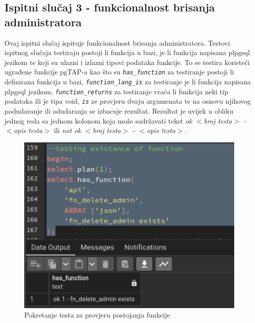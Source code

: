 				\subsection{Ispitni slučaj 3 - funkcionalnost brisanja administratora}
				Ovaj ispitni slučaj ispituje funkcionalnost brisanja administratora. Testovi ispitnog slučaja testiraju postoji li funkcija u bazi, je li funkcija napisana plpgsql jezikom te koji su ulazni i izlazni tipovi podataka funkcije. To se testira koristeći ugrađene funkcije pgTAP-a kao što su \textit{\texttt{has\_function}} za testiranje postoji li definirana funkcija u bazi, \textit{\texttt{function\_lang\_is}} za testiranje je li funkcija napisana plpgsql jezikom, \textit{\texttt{function\_returns}} za testiranje vraća li funkcija neki tip podataka ili je tipa void, \textit{\texttt{is\(\)}} ze provjeru dvaju argumenata te na osnovu njihovog podudaranje ili odudaranja se izbacuje rezultat. Rezultat je uvijek u obliku jednog reda sa jednom kolonom koja može sadržavati tekst \textit{ok $<$broj testa$>$ - $<$opis testa$>$} ili \textit{not ok $<$broj testa$>$ - $<$opis testa$>$}.
				\begin{figure}[H]
					\centering
					\includegraphics[width=\textwidth]{slike/unit_tests/ut_3/has_func.png}
					\caption{Pokretanje testa za provjeru postojanja funkcije}
					\label{fig: IS3-has_function}
				\end{figure}
